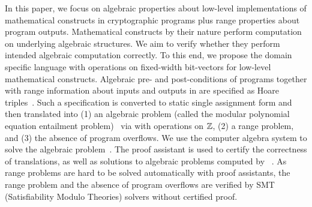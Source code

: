 In this paper, we focus on algebraic properties about low-level
implementations of mathematical constructs in cryptographic programs
plus range properties about program outputs.
Mathematical constructs by their nature perform computation on
underlying algebraic structures. We aim to verify whether they perform
intended algebraic computation correctly. To this end, we propose the
domain specific language \bvdsl with operations on fixed-width bit-vectors for low-level
mathematical constructs. Algebraic pre- and post-conditions of
programs together with range information about inputs and outputs in \bvdsl are specified as Hoare
triples~\cite{H:69:ABCP}.
Such a specification is converted to static single
assignment form and then translated into (1) an algebraic problem (called
the modular polynomial equation entailment
problem)~\cite{AWZ:88:DQVP,H:07:AENTP} via \zdsl with operations on $\mathbb{Z}$, (2) a range problem, and (3) the absence of program overflows. We use the computer
algebra system \singular to solve the algebraic problem~\cite{GP:08:SICA}.
The proof assistant \coq is used to certify the
correctness of translations, as well as solutions to algebraic
problems computed by \singular~\cite{YC:2004:ITPPDC}.
As range problems are hard to be solved automatically with proof assistants, the range problem and the absence of program overflows are verified by SMT (Satisfiability Modulo Theories) solvers without certified proof.

